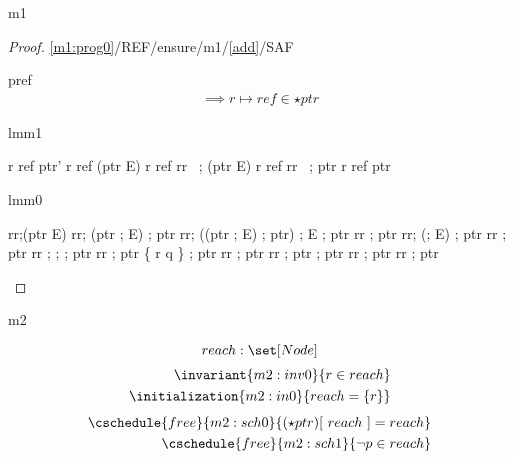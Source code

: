\documentclass[12pt]{amsart}
\newcommand{\lookup}[2]{#1[#2]}
\begin{document}
\begin{machine}{m1}
\begin{proof}{\ref{m1:prog0}/REF/ensure/m1/\ref{add}/SAF}
\begin{free:var}{p}{ref}
\begin{align*}
{		\implies r \mapsto ref \in \star ptr }
\end{align*}
\easy
\begin{subproof}{lmm1}
\begin{calculation}
	r \mapsto ref \in \star ptr'
\hint{=}{ \eqref{m1:act0} }
	r \mapsto ref \in \star (ptr \bunion E)
	r \mapsto ref \in rr \, ; \star (ptr \bunion E)
\hint{=}{ \eqref{lmm0} }
	r \mapsto ref \in rr \, ; \star ptr
\hint{=}{ }
	r \mapsto ref \in \star ptr
\end{calculation}
\end{subproof}
\end{free:var}
\begin{subproof}{lmm0}
\begin{calculation}
	rr;\star (ptr \0\bunion E)
\hint{=}{ }
	rr; \star (\star ptr ; E) ; \star ptr
\hint{=}{ }
	rr; (\star (\star ptr ; E) ; \star ptr) ; E ; \star ptr 
	\2\bunion rr ; \star ptr
	rr; (\all ; E) ; \star ptr 
	\2\bunion rr ; \star ptr
\hint{=}{ }
	rr ; \all ;  ; \star ptr 
	\2\bunion rr ; \star ptr
\hint{=}{ }
	\{ r \mapsto q \} ; \star ptr 
	\2\bunion rr ; \star ptr
\hint{\subseteq}{ \eqref{m1:grd0} }
	rr ; \star ptr ; \star ptr 
	\2\bunion rr ; \star ptr
\hint{=}{ }
	rr ; \star ptr
\end{calculation}	
\end{subproof}
\end{proof}

\end{machine}

	

\begin{machine}{m2}

	\[ \variable{reach : \set[Node]} \]
\begin{align}
	\invariant{m2:inv0}{ r \in reach } \\
	\initialization{m2:in0}{ reach = \{r\} }
\end{align}
\begin{align}
	\cschedule{free}{m2:sch0}
		{ \lookup{(\star ptr)}{~reach~} = reach } \\
	\cschedule{free}{m2:sch1}{ \neg p \in reach }
\end{align}

\end{machine}
\end{document}
